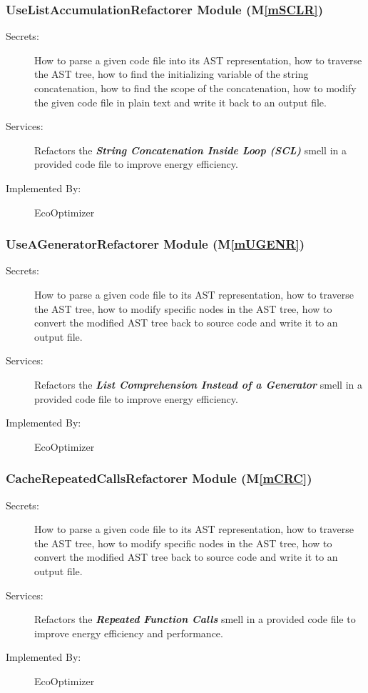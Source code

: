 \documentclass[12pt, titlepage]{article}
\newcommand{\mref}[1]{M\ref{#1}}
\begin{document}
\subsubsection{UseListAccumulationRefactorer Module (\mref{mSCLR})}


\begin{description}
\item[Secrets:] How to parse a given code file into its AST representation, how to traverse the AST tree, how to find the initializing variable of the string concatenation, how to find the scope of the concatenation, how to modify the given code file in plain text and write it back to an output file.
\item[Services:] Refactors the \textbf{\textit{String Concatenation Inside Loop (SCL)}} smell in a provided code file to improve energy efficiency.
\item[Implemented By:] EcoOptimizer
\end{description}

\subsubsection{UseAGeneratorRefactorer Module (\mref{mUGENR})}
\begin{description}
    \item[Secrets:] How to parse a given code file to its AST representation, how to traverse the AST tree, how to modify specific nodes in the AST tree, how to convert the modified AST tree back to source code and write it to an output file.
    \item[Services:] Refactors the \textbf{\textit{List Comprehension Instead of a Generator}} smell in a provided code file to improve energy efficiency.
    \item[Implemented By:] EcoOptimizer
\end{description}

\subsubsection{CacheRepeatedCallsRefactorer Module (\mref{mCRC})}
\begin{description}
    \item[Secrets:] How to parse a given code file to its AST representation, how to traverse the AST tree, how to modify specific nodes in the AST tree, how to convert the modified AST tree back to source code and write it to an output file.
    \item[Services:] Refactors the \textbf{\textit{Repeated Function Calls}} smell in a provided code file to improve energy efficiency and performance.
    \item[Implemented By:] EcoOptimizer
\end{description}
\end{document}
